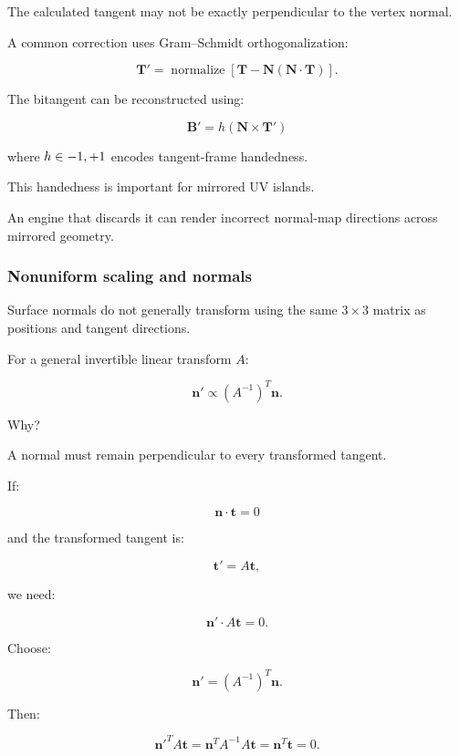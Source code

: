 \hypertarget{02-foundations-ii-ch032-orthogonalization}{}

The calculated tangent may not be exactly perpendicular to the vertex normal.

A common correction uses Gram--Schmidt orthogonalization:

\[
 \boxed{ \mathbf T'= \operatorname{normalize} \left[ \mathbf T-\mathbf N(\mathbf N\cdot\mathbf T) \right] }.
\]

The bitangent can be reconstructed using:

\[
 \boxed{ \mathbf B'=h(\mathbf N\times\mathbf T') }
\]

where \(h\in\\{-1,+1\\}\) encodes tangent-frame handedness.

This handedness is important for mirrored UV islands.

An engine that discards it can render incorrect normal-map directions across mirrored geometry.

\subsubsection{Nonuniform scaling and normals}\label{02-foundations-ii-ch032-nonuniform-scaling-and-normals}

\hypertarget{02-foundations-ii-ch032-nonuniform-scaling-and-normals}{}

Surface normals do not generally transform using the same \(3\times3\) matrix as positions and tangent directions.

For a general invertible linear transform \(A\):

\[
 \boxed{ \mathbf n'\propto(A^{-1})^T\mathbf n }.
\]

Why?

A normal must remain perpendicular to every transformed tangent.

If:

\[
 \mathbf n\cdot\mathbf t=0
\]

and the transformed tangent is:

\[
 \mathbf t'=A\mathbf t,
\]

we need:

\[
 \mathbf n'\cdot A\mathbf t=0.
\]

Choose:

\[
 \mathbf n'=(A^{-1})^T\mathbf n.
\]

Then:

\[
 \mathbf n'^TA\mathbf t = \mathbf n^TA^{-1}A\mathbf t = \mathbf n^T\mathbf t=0.
\]

